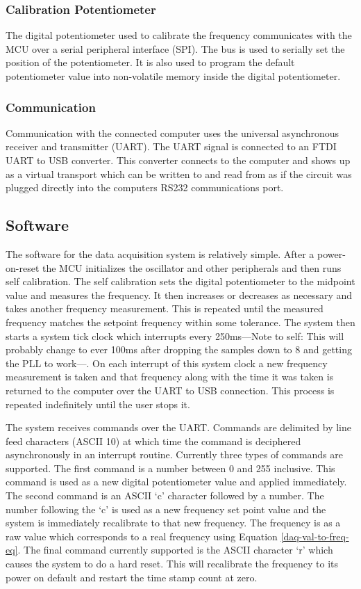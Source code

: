 \subsubsection{Calibration Potentiometer} 
The digital potentiometer used to calibrate the frequency communicates with the MCU over a serial peripheral interface (SPI).  The bus is used to serially set the position of the potentiometer.  It is also used to program the default potentiometer value into non-volatile memory inside the digital potentiometer.

\subsubsection{Communication}
Communication with the connected computer uses the universal asynchronous receiver and transmitter (UART).  The UART signal is connected to an FTDI UART to USB converter.  This converter connects to the computer and shows up as a virtual transport which can be written to and read from as if the circuit was plugged directly into the computers RS232 communications port.

\subsection{Software}
The software for the data acquisition system is relatively simple.  After a power-on-reset the MCU initializes the oscillator and other peripherals and then runs self calibration.  The self calibration sets the digital potentiometer to the midpoint value and measures the frequency.  It then increases or decreases as necessary and takes another frequency measurement.  This is repeated until the measured frequency matches the setpoint frequency within some tolerance.  The system then starts a system tick clock which interrupts every 250ms---Note to self: This will probably change to ever 100ms after dropping the samples down to 8 and getting the PLL to work---.  On each interrupt of this system clock a new frequency measurement is taken and that frequency along with the time it was taken is returned to the computer over the UART to USB connection.  This process is repeated indefinitely until the user stops it.  

The system receives commands over the UART. Commands are delimited by line feed characters (ASCII 10) at which time the command is deciphered asynchronously in an interrupt routine.  Currently three types of commands are supported.  The first command is a number between 0 and 255 inclusive.  This command is used as a new digital potentiometer value and applied immediately.  The second command is an ASCII `c' character followed by a number.  The number following the `c' is used as a new frequency set point value and the system is immediately recalibrate to that new frequency.  The frequency is as a raw value which corresponds to a real frequency using Equation \ref{daq-val-to-freq-eq}.  The final command currently supported is the ASCII character `r' which causes the system to do a hard reset.  This will recalibrate the frequency to its power on default and restart the time stamp count at zero.


